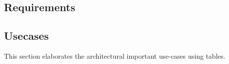 %

\begin{appendices}
			
				
	\renewcommand{\thechapter}{\Alph{chapter}}
	\renewcommand{\thesection}{\thechapter.\arabic{section}}
	\renewcommand{\thesubsection}{\thesection.\arabic{subsection}}
	\renewcommand{\thesubsubsection}{\thesubsection.\arabic{subsubsection}}
	
	\chapter{Requirements}
	\section{Usecases}
	This section elaborates the architectural important use-cases using tables.
	

\end{appendices}
